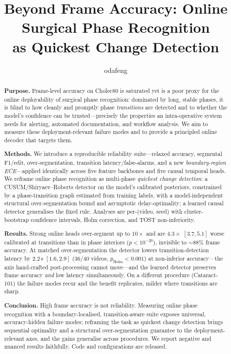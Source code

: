 \documentclass[11pt]{article}
\title{\bfseries Beyond Frame Accuracy: Online Surgical Phase Recognition\\
as Quickest Change Detection}
\author[1]{odafeng}
\affil[1]{\small \todo{affiliation --- fill before submission}}
\date{}
\begin{document}
\maketitle

\begin{abstract}
\noindent\textbf{Purpose.} Frame-level accuracy on Cholec80 is saturated yet is a poor
proxy for the online deployability of surgical phase recognition: dominated by long, stable
phases, it is blind to how cleanly and promptly phase \emph{transitions} are detected and to
whether the model's confidence can be trusted---precisely the properties an intra-operative
system needs for alerting, automated documentation, and workflow analysis. We aim to measure
these deployment-relevant failure modes and to provide a principled online decoder that
targets them.

\noindent\textbf{Methods.} We introduce a reproducible reliability suite---relaxed accuracy,
segmental F1/edit, over-segmentation, transition latency/false-alarms, and a new
\emph{boundary-region ECE}---applied identically across five feature backbones and five
causal temporal heads. We reframe online phase recognition as multi-phase \emph{quickest
change detection}: a CUSUM/Shiryaev--Roberts detector on the model's calibrated posteriors,
constrained by a phase-transition graph estimated from training labels, with a
model-independent structural over-segmentation bound and asymptotic delay-optimality; a
learned causal detector generalises the fixed rule. Analyses are per-(video, seed) with
cluster-bootstrap confidence intervals, Holm correction, and TOST non-inferiority.

\noindent\textbf{Results.} Strong online heads over-segment up to $10\times$ and are
$4.3\times$ $[3.7,5.1]$ worse calibrated at transitions than in phase interiors
($p<10^{-20}$), invisible to ${\sim}88\%$ frame accuracy. At matched over-segmentation the
detector lowers transition-detection latency by $2.2$\,s $[1.6,2.9]$ (36/40 videos,
$p_{\text{Holm}}<0.001$) at non-inferior accuracy---the axis hand-crafted post-processing
cannot move---and the learned detector preserves frame accuracy \emph{and} low latency
simultaneously. On a different procedure (Cataract-101) the failure modes recur and the
benefit replicates, milder where transitions are sharp.

\noindent\textbf{Conclusion.} High frame accuracy is not reliability. Measuring online phase
recognition with a boundary-localised, transition-aware suite exposes universal,
accuracy-hidden failure modes; reframing the task as quickest change detection brings
sequential optimality and a structural over-segmentation guarantee to the
deployment-relevant axes, and the gains generalise across procedures. We report negative and
nuanced results faithfully. Code and configurations are released.
\end{abstract}
\end{document}
